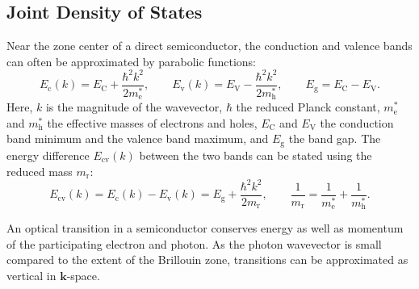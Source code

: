\subsection{Joint Density of States}
\label{sec:band_structure}

Near the zone center of a direct semiconductor, the conduction and valence bands
can often be approximated by parabolic functions:
\begin{equation}
	E_{\mathrm{c}}(k)=E_{\mathrm{C}}+\frac{\hbar^{2}k^{2}}{2m_{\mathrm{e}}^{*}},\qquad
	E_{\mathrm{v}}(k)=E_{\mathrm{V}}-\frac{\hbar^{2}k^{2}}{2m_{\mathrm{h}}^{*}},\qquad
	E_{\mathrm{g}}=E_{\mathrm{C}}-E_{\mathrm{V}}.
	\label{eq:band_dispersion}
\end{equation}
Here, $k$ is the magnitude of the wavevector, $\hbar$ the reduced Planck constant,
$m_{\mathrm{e}}^{*}$ and $m_{\mathrm{h}}^{*}$ the effective masses of electrons and
holes, $E_{\mathrm{C}}$ and $E_{\mathrm{V}}$ the conduction band minimum and the
valence band maximum, and $E_{\mathrm{g}}$ the band gap. The energy difference
$E_{\mathrm{cv}}(k)$ between the two bands can be stated using the reduced mass
$m_{\mathrm{r}}$:
\begin{equation}
	E_{\mathrm{cv}}(k)=E_{\mathrm{c}}(k)-E_{\mathrm{v}}(k)=E_{\mathrm{g}}+\frac{\hbar^{2}k^{2}}{2m_{\mathrm{r}}}
	,\qquad \frac{1}{m_{\mathrm{r}}}=\frac{1}{m_{\mathrm{e}}^{*}}+\frac{1}{m_{\mathrm{h}}^{*}}
	.
	\label{eq:parabolic_bands}
\end{equation}

An optical transition in a semiconductor conserves energy as well as momentum of the
participating electron and photon. As the photon wavevector is small compared to
the extent of the Brillouin zone, transitions can be approximated as vertical in $\mathbf{k}$-space.

